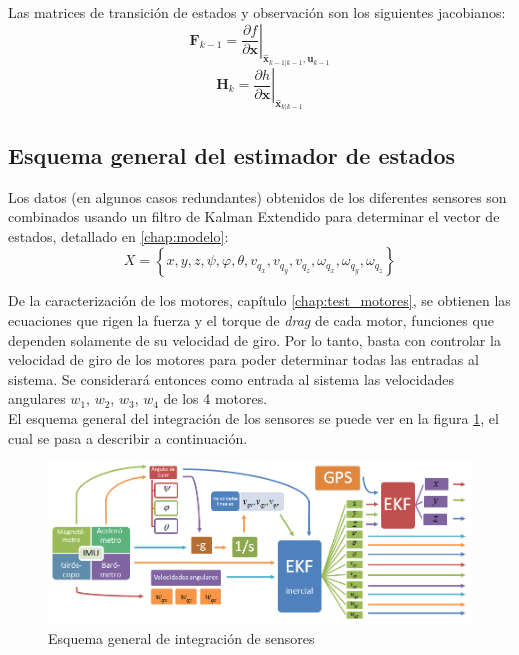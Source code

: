 \documentclass[main]{subfiles}
\begin{document}
Las matrices de transición de estados y observación son los siguientes jacobianos:
$$ { \mathbf{F}_{k-1}} = \left . \frac{\partial f}{\partial \mathbf{x} } \right \vert _{\hat{\mathbf{x}}_{k-1|k-1},\mathbf{u}_{k-1}} $$
\vspace{10pt}
$$ { \mathbf{H}_{k}} = \left . \frac{\partial h}{\partial \mathbf{x} } \right \vert _{\hat{\mathbf{x}}_{k|k-1}} $$


\subsection{Esquema general del estimador de estados}

Los datos (en algunos casos redundantes) obtenidos de los diferentes sensores son combinados usando un filtro de Kalman Extendido para determinar el vector de estados, detallado en \ref{chap:modelo}:
\begin{equation}
  \label{eq:estado}
  X=\left\lbrace  x,y,z,\psi,\varphi,\theta, v_{q_x},v_{q_y},v_{q_z},\omega_{q_x},\omega_{q_y},\omega_{q_z} \right\rbrace
\end{equation}

De la caracterización de los motores, capítulo \ref{chap:test_motores}, se obtienen las ecuaciones que rigen la fuerza y el torque de \emph{drag} de cada motor, funciones que dependen solamente de su velocidad de giro. Por lo tanto, basta con controlar la velocidad de giro de los motores para poder determinar todas las entradas al sistema. Se considerará entonces como entrada al sistema las velocidades angulares $w_1$, $w_2$, $w_3$, $w_4$ de los 4 motores.\\

El esquema general del integración de los sensores se puede ver en la figura \ref{fig:diagrama_kalman}, el cual se pasa a describir a continuación.

\begin{figure}[h!]
	\centering
	\includegraphics[width=1\textwidth]{./pics_kalman/diagrama_kalman.png}
	\caption{Esquema general de integración de sensores}
	\label{fig:diagrama_kalman}
\end{figure}
\end{document}
